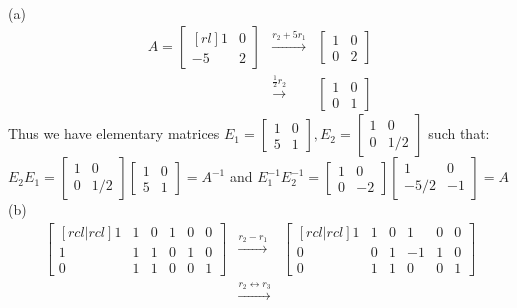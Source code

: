 \ee
\begin{solution}\ \\
(a) 
\begin{eqnarray*}
A =
\begin{bmatrix}[rl]
1&0\\
-5&2
\end{bmatrix}
&\xrightarrow[]{r_2+5r_1}&
\begin{bmatrix}
1&0\\
0&2
\end{bmatrix}\\
&\xrightarrow[]{\frac{1}{2}r_2}&
\begin{bmatrix}
1&0\\
0&1
\end{bmatrix}
\end{eqnarray*}
Thus we have elementary matrices
$E_1 =
\begin{bmatrix}
1&0\\
5&1
\end{bmatrix},
E_2 =
\begin{bmatrix}
1&0\\
0&1/2
\end{bmatrix}$ such that:\\
$E_2E_1 =
\begin{bmatrix}
1&0\\
0&1/2
\end{bmatrix}
\begin{bmatrix}
1&0\\
5&1
\end{bmatrix}
= A^{-1}
$ and $
E^{-1}_1E^{-1}_2 = 
\begin{bmatrix}
1&0\\
0&-2
\end{bmatrix}
\begin{bmatrix}
1&0\\
-5/2&-1
\end{bmatrix}
= A$
\\
(b) 
\begin{eqnarray*}
\begin{bmatrix}[rcl|rcl]
1&1&0&1&0&0\\
1&1&1&0&1&0\\
0&1&1&0&0&1
\end{bmatrix}
&\xrightarrow[]{r_2-r_1}&
\begin{bmatrix}[rcl|rcl]
1&1&0&1&0&0\\
0&0&1&-1&1&0\\
0&1&1&0&0&1
\end{bmatrix}\\
&\xrightarrow[]{r_2 \leftrightarrow r_3}&

\end{eqnarray*}
\end{solution}
